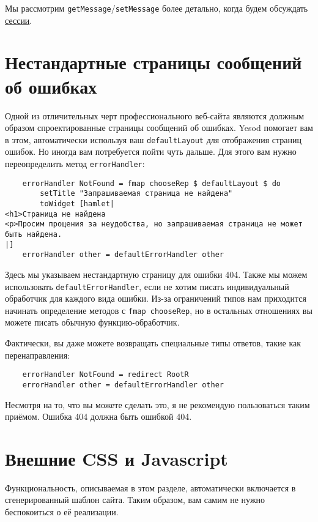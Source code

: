Мы рассмотрим \lstinline!getMessage!/\lstinline!setMessage! более детально, когда будем обсуждать \hyperref[chap:sessions]{сессии}.

\section {Нестандартные страницы сообщений об ошибках}

Одной из отличительных черт профессионального веб-сайта являются должным образом спроектированные страницы сообщений об ошибках. Yesod помогает вам в этом, автоматически используя ваш \lstinline!defaultLayout! для отображения страниц ошибок. Но иногда вам потребуется пойти чуть дальше. Для этого вам нужно переопределить метод \lstinline!errorHandler!:

\begin{lstlisting}
    errorHandler NotFound = fmap chooseRep $ defaultLayout $ do
        setTitle "Запрашиваемая страница не найдена"
        toWidget [hamlet|
<h1>Страница не найдена
<p>Просим прощения за неудобства, но запрашиваемая страница не может быть найдена.
|]
    errorHandler other = defaultErrorHandler other
\end{lstlisting}

Здесь мы указываем нестандартную страницу для ошибки 404. Также мы можем использовать \lstinline!defaultErrorHandler!, если не хотим писать индивидуальный обработчик для каждого вида ошибки. Из-за ограничений типов нам приходится начинать определение методов с \lstinline!fmap chooseRep!, но в остальных отношениях вы можете писать обычную функцию-обработчик.

Фактически, вы даже можете возвращать специальные типы ответов, такие как перенаправления:

\begin{lstlisting}
    errorHandler NotFound = redirect RootR
    errorHandler other = defaultErrorHandler other
\end{lstlisting}

\begin{remark}
Несмотря на то, что вы можете сделать это, я не рекомендую пользоваться таким приёмом. Ошибка 404 должна быть ошибкой 404.
\end{remark}

\section {Внешние CSS и Javascript}

\begin{remark}
Функциональность, описываемая в этом разделе, автоматически включается в сгенерированный шаблон сайта. Таким образом, вам самим не нужно беспокоиться о её реализации.
\end{remark}

